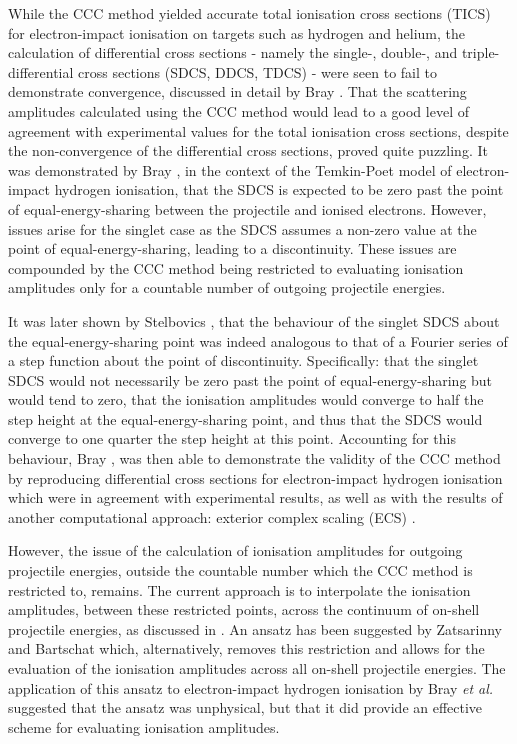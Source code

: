 \documentclass[draft]{article}
\begin{document}
While the CCC method yielded accurate total ionisation cross sections (TICS) for
electron-impact ionisation on targets such as hydrogen and helium, the
calculation of differential cross sections - namely the single-, double-, and
triple-differential cross sections (SDCS, DDCS, TDCS) - were seen to fail to
demonstrate convergence, discussed in detail by Bray \cite{PhysRevLett.78.4721}.
That the scattering amplitudes calculated using the CCC method would lead to a
good level of agreement with experimental values for the total ionisation cross
sections, despite the non-convergence of the differential cross sections, proved
quite puzzling.
It was demonstrated by Bray \cite{PhysRevLett.78.4721}, in the context of the
Temkin-Poet model \cite{PhysRev.126.130, Poet_1978} of electron-impact hydrogen
ionisation, that the SDCS is expected to be zero past the point of
equal-energy-sharing between the projectile and ionised electrons.
However, issues arise for the singlet case as the SDCS assumes a non-zero value
at the point of equal-energy-sharing, leading to a discontinuity.
These issues are compounded by the CCC method being restricted to evaluating
ionisation amplitudes only for a countable number of outgoing projectile
energies.

It was later shown by Stelbovics \cite{PhysRevLett.83.1570}, that the behaviour
of the singlet SDCS about the equal-energy-sharing point was indeed analogous to
that of a Fourier series of a step function about the point of discontinuity.
Specifically: that the singlet SDCS would not necessarily be zero past the point
of equal-energy-sharing but would tend to zero, that the ionisation amplitudes
would converge to half the step height at the equal-energy-sharing point, and
thus that the SDCS would converge to one quarter the step height at this point.
Accounting for this behaviour, Bray \cite{PhysRevLett.89.273201}, was then able
to demonstrate the validity of the CCC method by reproducing differential cross
sections for electron-impact hydrogen ionisation which were in agreement with
experimental results, as well as with the results of another computational
approach: exterior complex scaling (ECS) \cite{PhysRevA.64.022709}.

However, the issue of the calculation of ionisation amplitudes for outgoing
projectile energies, outside the countable number which the CCC method is
restricted to, remains.
The current approach is to interpolate the ionisation amplitudes, between these
restricted points, across the continuum of on-shell projectile energies, as
discussed in \cite{PhysRevLett.89.273201}.
An ansatz has been suggested by Zatsarinny and Bartschat
\cite{PhysRevLett.107.023203} which, alternatively, removes this restriction and
allows for the evaluation of the ionisation amplitudes across all on-shell
projectile energies.
The application of this ansatz to electron-impact hydrogen ionisation by Bray
\textit{et al.} \cite{PhysRevA.90.022710} suggested that the ansatz was
unphysical, but that it did provide an effective scheme for evaluating
ionisation amplitudes.
\end{document}
